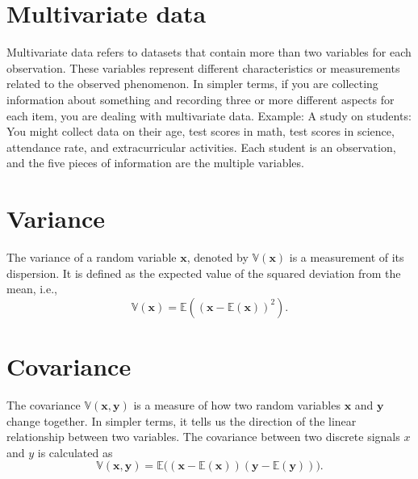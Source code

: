
\section{Multivariate data}
Multivariate data refers to datasets that contain more than two
variables for each observation. These variables represent different
characteristics or measurements related to the observed phenomenon. In
simpler terms, if you are collecting information about something and
recording three or more different aspects for each item, you are
dealing with multivariate data. Example: A study on students: You
might collect data on their age, test scores in math, test scores in
science, attendance rate, and extracurricular activities. Each student
is an observation, and the five pieces of information are the multiple
variables.



\section{Variance}
The variance of a random variable $\mathbf{x}$, denoted by
$\mathbb{V}(\mathbf{x})$ is a measurement of its dispersion. It is
defined as the expected value of the squared deviation from the mean,
i.e.,
\begin{equation}
  \mathbb{V}(\mathbf{x}) = \mathbb{E}\left((\mathbf{x} - \mathbb{E}(\mathbf{x}))^2 \right).
\end{equation}

\section{Covariance}
\label{sec:covariance}

The covariance $\mathbb{V}(\mathbf{x}, \mathbf{y})$ is a measure of
how two random variables $\mathbf{x}$ and $\mathbf{y}$ change
together. In simpler terms, it tells us the direction of the linear
relationship between two variables. The covariance between two
discrete signals $x$ and $y$ is calculated as
\begin{equation}
  \mathbb{V}(\textbf{x}, \textbf{y}) = \mathbb{E}\big((\mathbf{x}-\mathbb{E}(\mathbf{x}))(\mathbf{y}-\mathbb{E}(\mathbf{y}))\big).
\end{equation}


